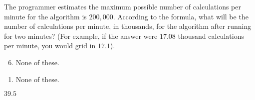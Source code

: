   The programmer estimates the maximum possible number of calculations per minute for the algorithm is $200,000$.  According to the formula, what will be the number of calculations per minute, in thousands, for the algorithm after running for two minutes?  (For example, if the answer were $17.08$ thousand calculations per minute, you would grid in $17.1$). 


\ifsat
	\begin{enumerate}[label=\Alph*)]
	\end{enumerate}
\else
\fi

\ifacteven
	\begin{enumerate}[label=\textbf{\Alph*.},itemsep=\fill,align=left]
		\setcounter{enumii}{5}
		\item None of these. 
	\end{enumerate}
\else
\fi

\ifactodd
	\begin{enumerate}[label=\textbf{\Alph*.},itemsep=\fill,align=left]
		\item None of these. 
	\end{enumerate}
\else
\fi

\ifgridin
$39.5$
\else
\fi

